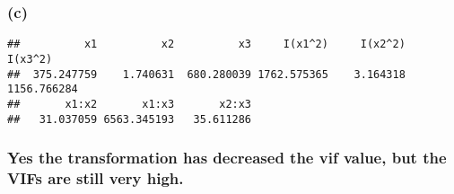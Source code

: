 \documentclass[
]{article}
\newenvironment{Shaded}{\begin{snugshade}}{\end{snugshade}}
\newcommand{\DecValTok}[1]{\textcolor[rgb]{0.00,0.00,0.81}{#1}}
\newcommand{\KeywordTok}[1]{\textcolor[rgb]{0.13,0.29,0.53}{\textbf{#1}}}
\newcommand{\NormalTok}[1]{#1}
\newcommand{\OperatorTok}[1]{\textcolor[rgb]{0.81,0.36,0.00}{\textbf{#1}}}
\newcommand{\StringTok}[1]{\textcolor[rgb]{0.31,0.60,0.02}{#1}}
\begin{document}
\hypertarget{c-1}{%
\subsubsection{(c)}\label{c-1}}

\begin{Shaded}
\end{Shaded}

\begin{verbatim}
##          x1          x2          x3     I(x1^2)     I(x2^2)     I(x3^2) 
##  375.247759    1.740631  680.280039 1762.575365    3.164318 1156.766284 
##       x1:x2       x1:x3       x2:x3 
##   31.037059 6563.345193   35.611286
\end{verbatim}

\hypertarget{yes-the-transformation-has-decreased-the-vif-value-but-the-vifs-are-still-very-high.}{%
\subsubsection{Yes the transformation has decreased the vif value, but
the VIFs are still very
high.}\label{yes-the-transformation-has-decreased-the-vif-value-but-the-vifs-are-still-very-high.}}
\end{document}
